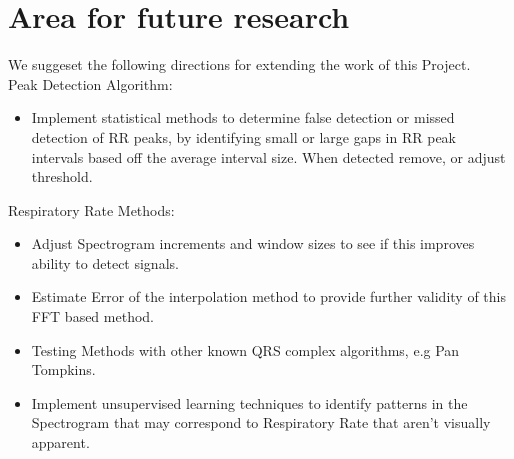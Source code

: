 \section{Area for future research}
We suggeset the following directions for extending the work of this Project. \\
Peak Detection Algorithm:
\begin{itemize}
        \item Implement statistical methods to determine false detection or missed detection of 
        RR peaks, by identifying small or large gaps in RR peak intervals based off the average interval size. 
        When detected remove, or adjust threshold. 
\end{itemize}
Respiratory Rate Methods:
\begin{itemize}
        \item Adjust Spectrogram increments and window sizes to see if this improves ability 
        to detect signals.
        \item Estimate Error of the interpolation method to provide further validity of this FFT based 
        method.
        \item Testing Methods with other known QRS complex algorithms, e.g Pan Tompkins.
        \item Implement unsupervised learning techniques to identify patterns in the Spectrogram that may 
        correspond to Respiratory Rate that aren't visually apparent. 
\end{itemize}